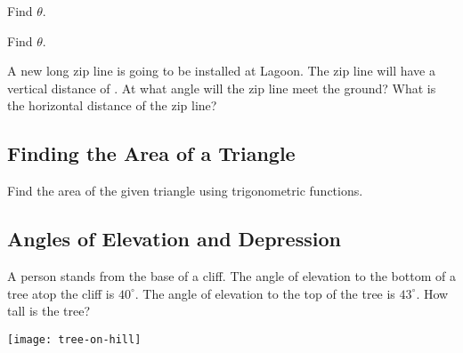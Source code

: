 \begin{exercise}
  Find \(\theta\).

  

\end{exercise}

\begin{exercise}
  Find \(\theta\).

  

\end{exercise}

\newpage

\begin{exercise}
  A new  long zip line is going to be installed at
  Lagoon. The zip line will have a vertical distance of .
  At what angle will the zip line meet the ground? What is the
  horizontal distance of the zip line?

\end{exercise}

\subsection{Finding the Area of a Triangle}%
\label{sub:area-triangle}

\begin{exercise}
  Find the area of the given triangle using trigonometric functions.

  

\end{exercise}

\newpage

\subsection{Angles of Elevation and Depression}%
\label{sub:angles-elevation-depression}

\begin{exercise}
  A person stands  from the base of a cliff. The angle
  of elevation to the bottom of a tree atop the cliff is
  \(40^{\circ}\). The angle of elevation to the top of the tree is
  \(43^{\circ}\). How tall is the tree?

  \texttt{[image: tree-on-hill]}

\end{exercise}

